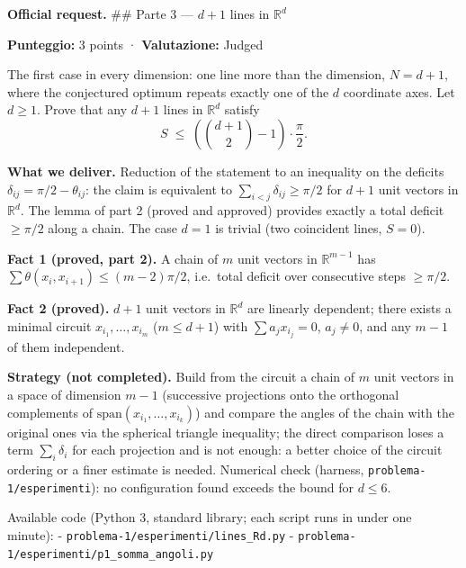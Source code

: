 
\textbf{Official request.} \#\# Parte 3 --- \(d+1\) lines in
\(\mathbb{R}^d\)

\textbf{Punteggio:} 3 points · \textbf{Valutazione:} Judged

The first case in every dimension: one line more than the dimension,
\(N = d+1\), where the conjectured optimum repeats exactly one of the
\(d\) coordinate axes. Let \(d \ge 1\). Prove that any \(d+1\) lines in
\(\mathbb{R}^d\) satisfy \[
S \;\le\; \left( \binom{d+1}{2} - 1 \right) \cdot \frac{\pi}{2}.
\]

\textbf{What we deliver.} Reduction of the statement to an inequality on
the deficits \(\delta_{ij}=\pi/2-\theta_{ij}\): the claim is equivalent
to \(\sum_{i<j}\delta_{ij}\ge\pi/2\) for \(d+1\) unit vectors in
\(\mathbb R^d\). The lemma of part 2 (proved and approved) provides
exactly a total deficit \(\ge\pi/2\) along a chain. The case \(d=1\) is
trivial (two coincident lines, \(S=0\)).


\textbf{Fact 1 (proved, part 2).} A chain of \(m\) unit vectors in
\(\mathbb R^{m-1}\) has \(\sum\theta(x_i,x_{i+1})\le(m-2)\pi/2\),
i.e.~total deficit over consecutive steps \(\ge\pi/2\).

\textbf{Fact 2 (proved).} \(d+1\) unit vectors in \(\mathbb R^d\) are
linearly dependent; there exists a minimal circuit
\(x_{i_1},\dots,x_{i_m}\) (\(m\le d+1\)) with \(\sum a_j x_{i_j}=0\),
\(a_j\ne0\), and any \(m-1\) of them independent.

\textbf{Strategy (not completed).} Build from the circuit a chain of
\(m\) unit vectors in a space of dimension \(m-1\) (successive
projections onto the orthogonal complements of
\(\mathrm{span}(x_{i_1},\dots,x_{i_k})\)) and compare the angles of the
chain with the original ones via the spherical triangle inequality; the
direct comparison loses a term \(\sum_i\delta_i\) for each projection
and is not enough: a better choice of the circuit ordering or a finer
estimate is needed. Numerical check (harness,
\texttt{problema-1/esperimenti}): no configuration found exceeds the
bound for \(d\le6\).


Available code (Python 3, standard library; each script runs in under
one minute): - \texttt{problema-1/esperimenti/lines\_Rd.py} -
\texttt{problema-1/esperimenti/p1\_somma\_angoli.py}


